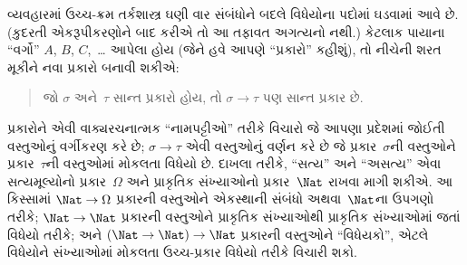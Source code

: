 વ્યવહારમાં ઉચ્ચ-ક્રમ તર્કશાસ્ત્ર ઘણી વાર સંબંધોને બદલે વિધેયોના પદોમાં
ઘડવામાં આવે છે. (કુદરતી એકરૂપીકરણોને બાદ કરીએ તો આ
તફાવત અગત્યનો નથી.) કેટલાક પાયાના ``વર્ગો'' $A$, $B$, $C$,~\dots
આપેલા હોય (જેને હવે આપણે ``પ્રકારો'' કહીશું), તો નીચેની શરત મૂકીને
નવા પ્રકારો બનાવી શકીએ:
\begin{quote}
જો $\sigma$ અને~$\tau$ સાન્ત પ્રકારો હોય, તો $\sigma \to \tau$ પણ
સાન્ત પ્રકાર છે.
\end{quote}
પ્રકારોને એવી વાક્યરચનાત્મક ``નામપટ્ટીઓ'' તરીકે વિચારો જે આપણા
પ્રદેશમાં જોઈતી વસ્તુઓનું વર્ગીકરણ કરે છે; $\sigma \to \tau$ એવી
વસ્તુઓનું વર્ણન કરે છે જે પ્રકાર~$\sigma$ની વસ્તુઓને પ્રકાર~$\tau$ની
વસ્તુઓમાં મોકલતા વિધેયો છે. દાખલા તરીકે, ``સત્ય'' અને ``અસત્ય'' એવા
સત્યમૂલ્યોનો પ્રકાર~$\Omega$ અને પ્રાકૃતિક સંખ્યાઓનો પ્રકાર~$\Nat$
રાખવા માગી શકીએ. આ કિસ્સામાં $\Nat \to \Omega$ પ્રકારની વસ્તુઓને
એકસ્થાની સંબંધો અથવા~$\Nat$ના ઉપગણો તરીકે; $\Nat \to \Nat$ પ્રકારની
વસ્તુઓને પ્રાકૃતિક સંખ્યાઓથી પ્રાકૃતિક સંખ્યાઓમાં જતાં વિધેયો તરીકે;
અને $(\Nat \to \Nat) \to \Nat$ પ્રકારની વસ્તુઓને ``વિધેયકો'', એટલે
વિધેયોને સંખ્યાઓમાં મોકલતા ઉચ્ચ-પ્રકાર વિધેયો તરીકે વિચારી શકો.

